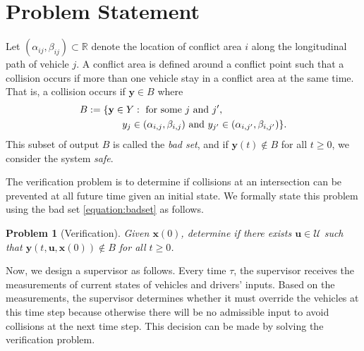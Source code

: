\documentclass{sig-alternate}
\newtheorem{problem}{Problem}
\begin{document}
\section{Problem Statement}\label{section:problem_statement}

Let $(\alpha_{ij}, \beta_{ij})\subset\mathbb{R}$ denote the location of conflict area $i$ along the longitudinal path of vehicle $j$. A conflict area is defined around a conflict point such that a collision occurs if more than one vehicle stay in a conflict area at the same time. That is, a collision occurs if $\mathbf{y}\in B$ where
\begin{align}\label{equation:badset}
\begin{split}
&B:=\{\mathbf{y}\in Y:~\text{for some}~j~\text{and}~j',\\
&\hspace{0.6 in} y_j\in (\alpha_{i,j}, \beta_{i,j})~\text{and}~y_{j'}\in (\alpha_{i,j'}, \beta_{i,j'})\}.
\end{split}
\end{align}
This subset of output $B$ is called the \textit{bad set}, and if $\mathbf{y}(t)\notin B$ for all $t\geq 0$, we consider the system \textit{safe}.

The verification problem is to determine if collisions at an intersection can be prevented at all future time given an initial state. We formally state this problem using the bad set \eqref{equation:badset} as follows.

\begin{problem}[Verification]\label{problem:verification}
Given $\mathbf{x}(0)$, determine if there exists $\mathbf{u}\in\mathcal{U}$ such that $\mathbf{y}(t,\mathbf{u},\mathbf{x}(0))\notin B$ for all $t\geq 0$.
\end{problem}	
	
	 
Now, we design a supervisor as follows. Every time $\tau$, the supervisor receives the measurements of current states of vehicles and drivers' inputs. Based on the measurements, the supervisor determines whether it must override the vehicles at this time step because otherwise there will be no admissible input to avoid collisions at the next time step. This decision can be made by solving the verification problem. 
\end{document}

